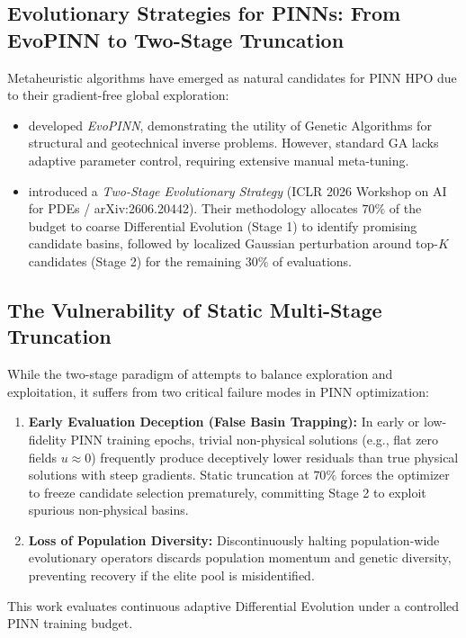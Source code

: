 \documentclass[authoryear,preprint,12pt]{elsarticle}
\begin{document}
\subsection{Evolutionary Strategies for PINNs: From EvoPINN to Two-Stage Truncation}
Metaheuristic algorithms have emerged as natural candidates for PINN HPO due to their gradient-free global exploration:
\begin{itemize}
    \item \citet{jasim2026evopinn} developed \textit{EvoPINN}, demonstrating the utility of Genetic Algorithms for structural and geotechnical inverse problems. However, standard GA lacks adaptive parameter control, requiring extensive manual meta-tuning.
    \item \citet{buzaev2026evolutionary} introduced a \textit{Two-Stage Evolutionary Strategy} (ICLR 2026 Workshop on AI for PDEs / arXiv:2606.20442). Their methodology allocates $70\%$ of the budget to coarse Differential Evolution (Stage 1) to identify promising candidate basins, followed by localized Gaussian perturbation around top-$K$ candidates (Stage 2) for the remaining $30\%$ of evaluations.
\end{itemize}

\subsection{The Vulnerability of Static Multi-Stage Truncation}
While the two-stage paradigm of \citet{buzaev2026evolutionary} attempts to balance exploration and exploitation, it suffers from two critical failure modes in PINN optimization:
\begin{enumerate}
    \item \textbf{Early Evaluation Deception (False Basin Trapping):} In early or low-fidelity PINN training epochs, trivial non-physical solutions (e.g., flat zero fields $u \approx 0$) frequently produce deceptively lower residuals than true physical solutions with steep gradients. Static truncation at $70\%$ forces the optimizer to freeze candidate selection prematurely, committing Stage 2 to exploit spurious non-physical basins.
    \item \textbf{Loss of Population Diversity:} Discontinuously halting population-wide evolutionary operators discards population momentum and genetic diversity, preventing recovery if the elite pool is misidentified.
\end{enumerate}

This work evaluates continuous adaptive Differential Evolution under a controlled PINN training budget.
\end{document}
